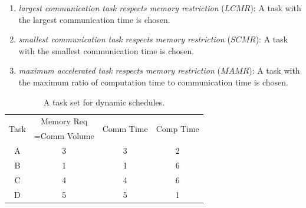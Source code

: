 \documentclass[sigconf]{acmart}
\begin{document}
	\begin{enumerate}[label=\roman*)]
		\item \textit{largest communication task respects memory restriction} ($LCMR$): A task with the largest communication time is chosen. 
		\item \textit{smallest communication task respects memory restriction} ($SCMR$): A task with the smallest communication time is chosen.
		\item \textit{maximum accelerated task respects memory restriction} ($MAMR$): A task with the maximum ratio of computation time to communication time is chosen.
	\end{enumerate}
	\begin{table}[htb]
		\begin{center}
			
			\begin{tabular}{|c|c|c|c|}
				\hline
				\multirow{2}{*}{Task} & Memory Req & \multirow{2}{*}{Comm Time} & \multirow{2}{*}{Comp Time}\\  
				&=Comm Volume && \\ \hline
				A & 3 & 3 & 2\\ \hline
				B & 1 & 1 &  6\\ \hline
				C & 4 & 4 & 6\\ \hline
				D & 5 & 5 & 1\\ \hline
			\end{tabular}
			\caption{\label{tab:dynamicSelectionExample} A task set for dynamic schedules.}
		\end{center}
	\end{table}
	
\end{document}
